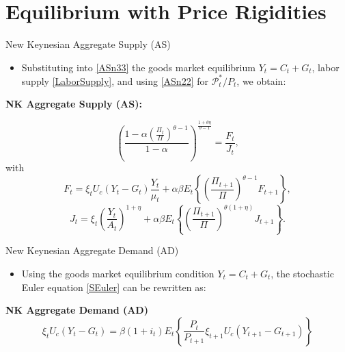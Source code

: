 \documentclass[11pt,aspectratio=169]{beamer}
\begin{document}
\section{Equilibrium with Price Rigidities}
\begin{frame}[label=NKASFinal]{New Keynesian Aggregate Supply (AS)}
\small

\begin{itemize}
  \item Substituting into \eqref{ASn33} the goods market equilibrium $Y_t = C_t + G_t$, labor supply \eqref{LaborSupply}, and using \eqref{ASn22} for $\mathcal{P}_t^\ast / P_t$, we obtain: 
\end{itemize}
\vspace{0.5em}
 \textbf{NK Aggregate Supply (AS):}

\begin{equation}
\left( \frac{1-\alpha \left( \frac{\Pi_t}{\Pi} \right)^{\theta-1}}{1-\alpha} \right)^{\frac{1+\theta \eta}{\theta-1}} = \frac{F_t}{J_t},
\label{AS1final1}
\end{equation}
\hspace{0.65cm} with
\begin{equation}
F_t = \xi_t U_c(Y_t - G_t) \frac{Y_t}{\mu_t} + \alpha \beta E_t \left\{ \left( \frac{\Pi_{t+1}}{\Pi} \right)^{\theta-1} F_{t+1} \right\}, 
\label{AS2final2}
\end{equation}
\begin{equation}
J_t = \xi_t \left( \frac{Y_t}{A_t} \right)^{1+\eta} + \alpha \beta E_t \left\{ \left( \frac{\Pi_{t+1}}{\Pi} \right)^{\theta(1+\eta)} J_{t+1} \right\}.
\label{AS3final3}
\end{equation}
\begin{center}
\hyperlink{DerivationAggSupply}{}
\end{center}
\end{frame}
\begin{frame}{New Keynesian Aggregate Demand (AD)}
\small
\begin{itemize}
    \item Using the goods market equilibrium condition $Y_t = C_t + G_t$, the stochastic Euler equation \eqref{SEuler} can be rewritten as:
\end{itemize}
\vspace{1em}
\textbf{NK Aggregate Demand (AD)}
\begin{equation}
\xi _{t}U_{c}(Y_{t}-G_{t})=\beta (1+i_{t})E_{t}\left\{ \frac{P_{t}}{P_{t+1}}%
\xi _{t+1}U_{c}(Y_{t+1}-G_{t+1})\right\}   \label{ADFinal}
\end{equation}
\end{frame}
\end{document}
